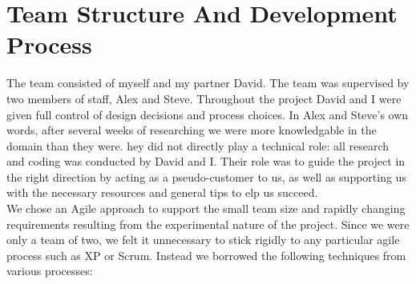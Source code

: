 \documentclass[a4paper,11pt]{report}
\begin{document}
\chapter{Team Structure And Development Process}
The team consisted of myself and my partner David. The team was supervised by two members of staff, Alex and Steve. Throughout the project David and I were given full control of design decisions and process choices. In Alex and Steve's own words, after several weeks of researching we were more knowledgable in the domain than they were. hey did not directly play a technical role: all research and coding was conducted by David and I. Their role was to guide the project in the right direction by acting as a pseudo-customer to us, as well as supporting us with the necessary resources and general tips to elp us succeed.\\
We chose an Agile approach to support the small team size and rapidly changing requirements resulting from the experimental nature of the project. Since we were only a team of two, we felt it unnecessary to stick rigidly to any particular agile process such as XP or Scrum. Instead we borrowed the following techniques from various processes:
\end{document}

